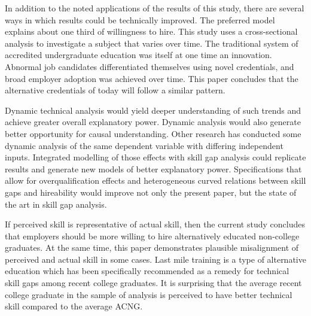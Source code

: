 \documentclass[review]{elsarticle}
\begin{document}

In addition to the noted applications of the results of this study, there are several ways in which results could be technically improved.
The preferred model explains about one third of willingness to hire.
This study uses a cross-sectional analysis to investigate a subject that varies over time.
The traditional system of accredited undergraduate education was itself at one time an innovation.
Abnormal job candidates differentiated themselves using novel credentials, and broad employer adoption was achieved over time.
This paper concludes that the alternative credentials of today will follow a similar pattern.

Dynamic technical analysis would yield deeper understanding of such trends and achieve greater overall explanatory power.
Dynamic analysis would also generate better opportunity for causal understanding.
Other research has conducted some dynamic analysis of the same dependent variable
with differing independent inputs\cite{vandivier2020preliminary}.
Integrated modelling of those effects with skill gap analysis could replicate results and generate new models of better explanatory power.
Specifications that allow for overqualification effects and heterogeneous curved relations between skill gaps and hireability would improve not only the present paper,
but the state of the art in skill gap analysis.

If perceived skill is representative of actual skill,
then the current study concludes that employers should be more willing to hire alternatively educated non-college graduates.
At the same time, this paper demonstrates plausible misalignment of perceived and actual skill in some cases.
Last mile training is a type of alternative education which has been specifically recommended as a remedy for technical skill gaps among recent college graduates.
It is surprising that the average recent college graduate in the sample of analysis is perceived to have better technical skill compared to the average ACNG.
\end{document}
